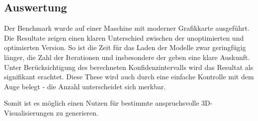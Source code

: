 \subsection{Auswertung}
\label{chap:benchmarkResults}

Der Benchmark wurde auf einer Maschine mit moderner Grafikkarte ausgeführt. Die Resultate zeigen einen klaren Unterschied zwischen der unoptimierten und optimierten Version. So ist die Zeit für das Laden der Modelle zwar geringfügig länger, die Zahl der  Iterationen und insbesondere der  geben eine klare Auskunft. Unter Berücksichtigung des berechneten Konfidenzintervalls wird das Resultat als signifikant erachtet. Diese These wird auch durch eine einfache Kontrolle mit dem Auge belegt - die Anzahl  unterscheidet sich merkbar.

Somit ist es möglich einen Nutzen für bestimmte anspruchsvolle 3D-Visualisierungen zu generieren.